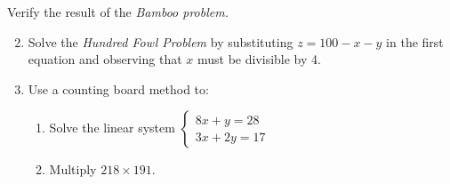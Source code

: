 \clearpage

  
\begin{exercisessec}{}{}
	\exstart Verify the result of the \emph{Bamboo problem.}
	
	\begin{enumerate}\setcounter{enumi}{1}
	  \item Solve the \emph{Hundred Fowl Problem} by substituting $z=100-x-y$ in the first equation and observing that $x$ must be divisible by 4.
	
		\item Use a counting board method to:
		\begin{enumerate}
		  \item Solve the linear system
		  $\begin{cases}
		  	8x+y=28\\
		  	3x+2y=17
		  \end{cases}$
			\item Multiply $218\times 191$.
		\end{enumerate}
		
	
	  

\end{enumerate}
\end{exercisessec}
